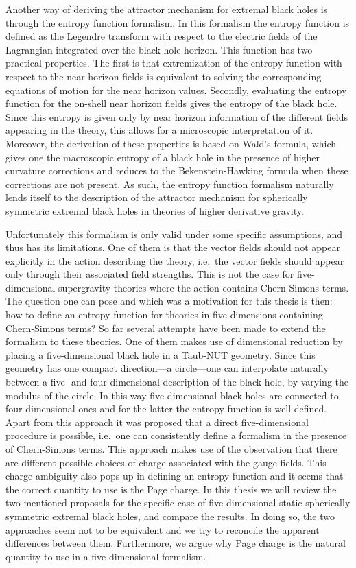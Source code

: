 \documentclass[12pt,twoside]{book}
\begin{document}
Another way of deriving the attractor mechanism for extremal black holes is through the entropy function formalism. In this formalism the entropy function is defined as the Legendre transform with respect to the electric fields of the Lagrangian integrated over the black hole horizon. This function has two practical properties. The first is that extremization of the entropy function with respect to the near horizon fields is equivalent to solving the corresponding equations of motion for the near horizon values. Secondly, evaluating the entropy function for the on-shell near horizon fields gives the entropy of the black hole. Since this entropy is given only by near horizon information of the different fields appearing in the theory, this allows for a microscopic interpretation of it. Moreover, the derivation of these properties is based on Wald's formula, which gives one the macroscopic entropy of a black hole in the presence of higher curvature corrections and reduces to the Bekenstein-Hawking formula when these corrections are not present.
As such, the entropy function formalism naturally lends itself to the description of the attractor mechanism for spherically symmetric extremal black holes in theories of higher derivative gravity.

Unfortunately this formalism is only valid under some specific assumptions, and thus has its limitations. One of them is that the vector fields should not appear explicitly in the action describing the theory, i.e.\ the vector fields should appear only through their associated field strengths. This is not the case for five-dimensional supergravity theories where the action contains Chern-Simons terms. The question one can pose and which was a motivation for this thesis is then: how to define an entropy function for theories in five dimensions containing Chern-Simons terms? So far several attempts have been made to extend the formalism to these theories. One of them makes use of dimensional reduction by placing a five-dimensional black hole in a Taub-NUT geometry. Since this geometry has one compact direction---a circle---one can interpolate naturally between a five- and four-dimensional description of the black hole, by varying the modulus of the circle. In this way five-dimensional black holes are connected to four-dimensional ones and for the latter the entropy function is well-defined. Apart from this approach it was proposed that a direct five-dimensional procedure is possible, i.e.\ one can consistently define a formalism in the presence of Chern-Simons terms. This approach makes use of the observation that there are different possible choices of charge associated with the gauge fields. This charge ambiguity also pops up in defining an entropy function and it seems that the correct quantity to use is the Page charge. In this thesis we will review the two mentioned proposals for the specific case of five-dimensional static spherically symmetric extremal black holes, and compare the results. In doing so, the two approaches seem not to be equivalent and we try to reconcile the apparent differences between them.
Furthermore, we argue why Page charge is the natural quantity to use in a five-dimensional formalism.\newline
\end{document}
